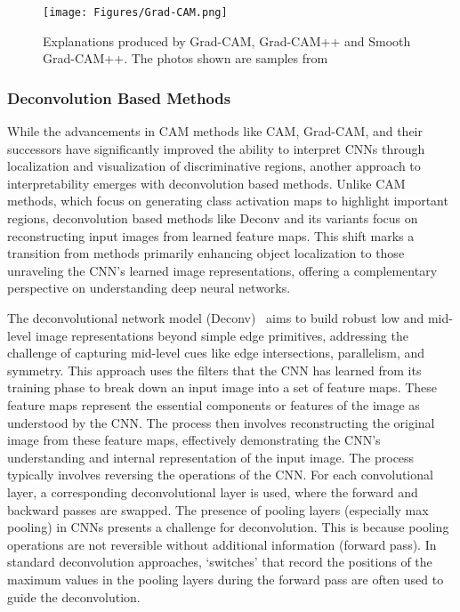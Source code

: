 \begin{figure}[ht!]
	\begin{center}
		\texttt{[image: Figures/Grad-CAM.png]}
	\end{center}
	\caption{Explanations produced by Grad-CAM, Grad-CAM++ and Smooth Grad-CAM++. The photos shown are samples from~\cite{abs-1908-01224}}
	\label{Fig:Grad-CAM}
\end{figure} 
\subsubsection{Deconvolution Based Methods}
\label{decov}

While the advancements in CAM methods like CAM, Grad-CAM, and their successors have significantly improved the ability to interpret CNNs through localization and visualization of discriminative regions, another approach to interpretability emerges with deconvolution based methods. Unlike CAM methods, which focus on generating class activation maps to highlight important regions, deconvolution based methods like Deconv and its variants focus on reconstructing input images from learned feature maps. This shift marks a transition from methods primarily enhancing object localization to those unraveling the CNN's learned image representations, offering a complementary perspective on understanding deep neural networks. 

The deconvolutional network model (Deconv)~\cite{ZeilerKTF10} aims to build robust low and mid-level image representations beyond simple edge primitives, addressing the challenge of capturing mid-level cues like edge intersections, parallelism, and symmetry. This approach uses the filters that the CNN has learned from its training phase to break down an input image into a set of feature maps. These feature maps represent the essential components or features of the image as understood by the CNN. The process then involves reconstructing the original image from these feature maps, effectively demonstrating the CNN's understanding and internal representation of the input image. The process typically involves reversing the operations of the CNN. For each convolutional layer, a corresponding deconvolutional layer is used, where the forward and backward passes are swapped. The presence of pooling layers (especially max pooling) in CNNs presents a challenge for deconvolution. This is because pooling operations are not reversible without additional information (\eg forward pass). In standard deconvolution approaches, `switches' that record the positions of the maximum values in the pooling layers during the forward pass are often used to guide the deconvolution.

